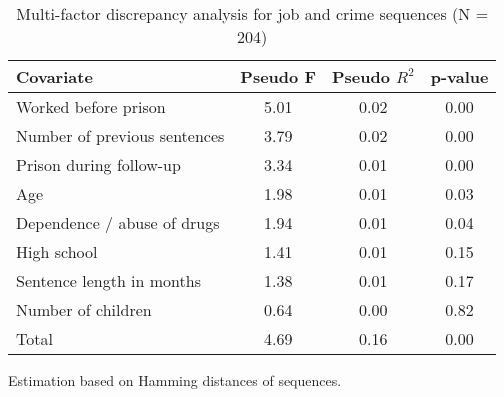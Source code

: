 \begin{table}[htp]
\footnotesize
\setlength{\tabcolsep}{10pt}
\renewcommand{\arraystretch}{1.3}
\begin{threeparttable}
\centering
\caption{Multi-factor discrepancy analysis for job and crime sequences (N = 204)} 
\label{tab:discrepancy_job_crime}
\begin{tabular}{lccc}
  \hline
Covariate & Pseudo F & Pseudo $R^2$ & p-value \\ 
  \hline
Worked before prison & 5.01 & 0.02 & 0.00 \\ 
  Number of previous sentences & 3.79 & 0.02 & 0.00 \\ 
  Prison during follow-up & 3.34 & 0.01 & 0.00 \\ 
  Age & 1.98 & 0.01 & 0.03 \\ 
  Dependence / abuse of drugs & 1.94 & 0.01 & 0.04 \\ 
  High school & 1.41 & 0.01 & 0.15 \\ 
  Sentence length in months & 1.38 & 0.01 & 0.17 \\ 
  Number of children & 0.64 & 0.00 & 0.82 \\ 
  Total & 4.69 & 0.16 & 0.00 \\ 
   \hline
\end{tabular}
\begin{tablenotes}
\scriptsize
\item Estimation based on Hamming distances of sequences.
\end{tablenotes}
\end{threeparttable}
\end{table}
